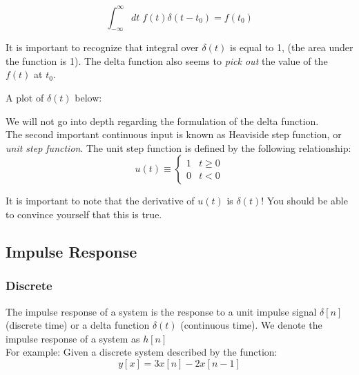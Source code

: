 \documentclass[a4paper]{article}
\numberwithin{equation}{section}
\begin{document}
\begin{equation}
\int_{-\infty}^{\infty}dt\; f(t) \delta(t-t_0) = f(t_0)
\end{equation}

It is important to recognize that integral over $\delta(t)$ is equal to 1, (the area under the function is 1). The delta function also seems to \textit{pick out} the value of the $f(t)$ at $t_0$. \\
\bigskip

A plot of $\delta(t)$ below:
\begin{center}
\end{center}

We will not go into depth regarding the formulation of the delta function. \\
The second important continuous input is known as Heaviside step function, or \textit{unit step function}. The unit step function is defined by the following relationship:
\begin{equation}
u(t) \equiv
\begin{cases} 
      1 & t\geq0 \\
      0 & t < 0
   \end{cases}
\end{equation}


It is important to note that the derivative of $u(t)$ is $\delta(t)$! You should be able to convince yourself that this is true. 

\subsection{Impulse Response}
\subsubsection{Discrete}
The impulse response of a system is the response to a unit impulse signal $\delta[n]$ (discrete time) or a delta function $\delta(t)$ (continuous time). We denote the impulse response of a system as $h[n]$ \\

For example: Given a discrete system described by the function:
\begin{equation}
y[x]=3x[n]-2x[n-1]
\end{equation}
\end{document}
